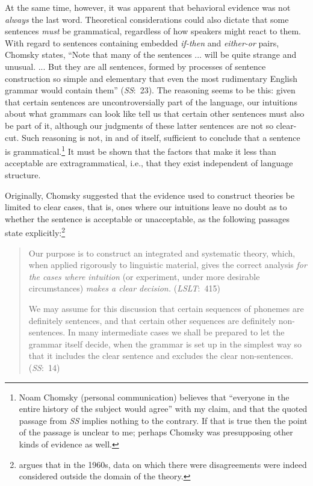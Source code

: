 At the same time, however, it was apparent that behavioral evidence was not \textit{always} the last word. Theoretical considerations could also dictate that some sentences \textit{must} be grammatical, regardless of how speakers might react to them. With regard to sentences containing embedded \textit{if-then} and \textit{either-or} pairs, Chomsky states, ``Note that many of the sentences ... will be quite strange and unusual. ... But they are all  sentences, formed by processes of sentence construction so simple and elementary that even the most rudimentary English grammar would contain them'' (\textit{SS}:~23). The reasoning seems to be this: given that
certain sentences are uncontroversially part of the language, our intuitions about what grammars can look like tell us that certain other sentences must also be part of it, although our judgments of these latter sentences are not so clear-cut. Such reasoning is not, in and of itself, sufficient to conclude that a sentence is grammatical.\footnote{Noam Chomsky (personal communication) believes that ``everyone in the entire history of the subject would agree'' with my claim, and that the quoted passage from \textit{SS} implies nothing to the contrary. If that is true then the point of the passage is unclear to me; perhaps Chomsky was presupposing other kinds of evidence as well.
} It must be shown that the factors that make it less than acceptable are extragrammatical, i.e., that they exist independent of language structure.

Originally, Chomsky suggested that the evidence used to construct theories be limited to clear cases, that is, ones where our intuitions leave no doubt as to whether the sentence is acceptable or unacceptable, as the following passages state explicitly:\footnote{\citet{Carden1973} argues that in the 1960s, data on which there were disagreements were indeed considered outside the domain of the theory.
}
\begin{quote}
Our purpose is to construct an integrated and systematic theory, which, when applied rigorously to linguistic material, gives the correct analysis \textit{for the cases where intuition} (or experiment, under more desirable circumstances) \textit{makes a clear decision.} (\textit{LSLT}:~415)

We may assume for this discussion that certain sequences of phonemes are definitely sentences, and that certain other sequences are definitely non-sentences. In many intermediate cases we shall be prepared to let the grammar itself decide, when the grammar is set up in the simplest way so that it includes the clear sentence and excludes the clear non-sentences. (\textit{SS}:~14)
 \end{quote}

